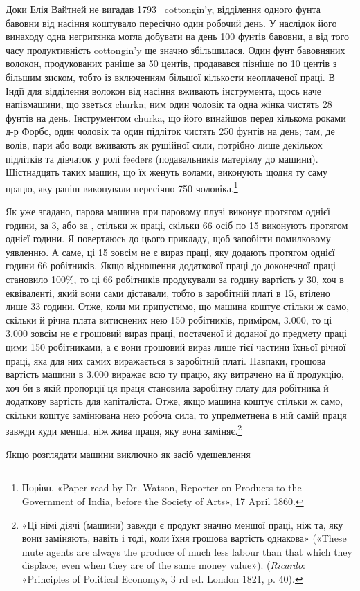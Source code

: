 \parcont{}  %
Доки Елія Вайтней не вигадав 1793~ cottongin’y, відділення одного
фунта бавовни від насіння коштувало пересічно один робочий
день. У наслідок його винаходу одна негритянка могла добувати
на день 100 фунтів бавовни, а від того часу продуктивність cottongin’y
ще значно збільшилася. Один фунт бавовняних волокон,
продукованих раніше за 50 центів, продавався пізніше по
10 центів з більшим зиском, тобто із включенням більшої кількости
неоплаченої праці. В Індії для відділення волокон від насіння
вживають інструмента, щось наче напівмашини, що зветься
churka; ним один чоловік та одна жінка чистять 28 фунтів на день.
Інструментом churka, що його винайшов перед кількома роками д-р Форбс, один
чоловік та один підліток чистять 250 фунтів на
день; там, де волів, пари або води вживають як рушійної сили,
потрібно лише декількох підлітків та дівчаток у ролі feeders
(подавальників матеріялу до машини). Шістнадцять таких машин,
що їх женуть волами, виконують щодня ту саму працю, яку раніш
виконували пересічно 750 чоловіка.\footnote{
Порівн. «Paper read by Dr. Watson, Reporter on Products to the
Government of India, before the Society of Arts», 17 April 1860.
}

Як уже згадано, парова машина при паровому плузі виконує
протягом однієї години, за 3, або за , стільки ж
праці, скільки 66 осіб по 15 виконують протягом однієї
години. Я повертаюсь до цього прикладу, щоб запобігти помилковому
уявленню. А саме, ці 15 зовсім не є вираз праці, яку
додають протягом однієї години 66 робітників. Якщо відношення
додаткової праці до доконечної праці становило 100\%, то ці
66 робітників продукували за годину вартість у 30,
хоч в еквіваленті, який вони сами діставали, тобто в заробітній
платі в 15, втілено лише 33 години. Отже, коли ми припустимо,
що машина коштує стільки ж само, скільки й річна
плата витиснених нею 150 робітників, приміром, \num{3.000}, то ці \num{3.000} зовсім не є грошовий
вираз праці, постаченої й доданої до предмету праці цими 150 робітниками,
а є вони грошовий вираз лише тієї частини їхньої
річної праці, яка для них самих виражається в заробітній платі.
Навпаки, грошова вартість машини в \num{3.000}
виражає всю ту працю, яку витрачено на її продукцію, хоч би
в якій пропорції ця праця становила заробітну плату для
робітника й додаткову вартість для капіталіста. Отже, якщо
машина коштує стільки ж само, скільки коштує замінювана нею
робоча сила, то упредметнена в ній самій праця завжди куди
менша, ніж жива праця, яку вона заміняє.\footnote{
«Ці німі діячі (машини) завжди є продукт значно меншої праці,
ніж та, яку вони заміняють, навіть і тоді, коли їхня грошова вартість
однакова» («These mute agents are always the produce of much less labour
than that which they displace, even when they are of the same money
value»). (\emph{Ricardo}: «Principles of Political Economy», 3 rd ed. London
1821, p. 40).
}

Якщо розглядати машини виключно як засіб удешевлення
\parbreak{}  %
